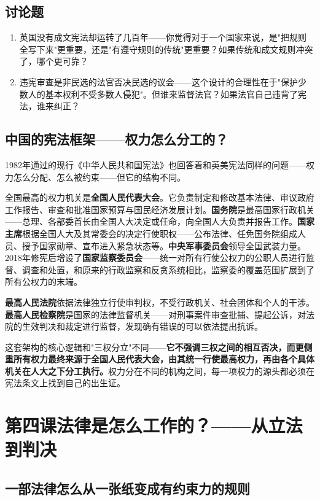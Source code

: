 \documentclass[a4paper,12pt]{ctexart}
\begin{document}
\subsection*{讨论题}
\begin{enumerate}
  \item 英国没有成文宪法却运转了几百年——你觉得对于一个国家来说，是"把规则全写下来"更重要，还是"有遵守规则的传统"更重要？如果传统和成文规则冲突了，哪个更可靠？
  \item 违宪审查是非民选的法官否决民选的议会——这个设计的合理性在于"保护少数人的基本权利不受多数人侵犯"。但谁来监督法官？如果法官自己违背了宪法，谁来纠正？
\end{enumerate}

\subsection*{中国的宪法框架——权力怎么分工的？}

1982年通过的现行《中华人民共和国宪法》也回答着和英美宪法同样的问题——权力怎么分配、怎么被约束——但它的结构不同。

全国最高的权力机关是\textbf{全国人民代表大会}。它负责制定和修改基本法律、审议政府工作报告、审查和批准国家预算与国民经济发展计划。\textbf{国务院}是最高国家行政机关——总理、各部委首长由全国人大决定或任命，向全国人大负责并报告工作。\textbf{国家主席}根据全国人大及其常委会的决定行使职权——公布法律、任免国务院组成人员、授予国家勋章、宣布进入紧急状态等。\textbf{中央军事委员会}领导全国武装力量。2018年修宪后增设了\textbf{国家监察委员会}——统一对所有行使公权力的公职人员进行监督、调查和处置，和原来的行政监察和反贪系统相比，监察委的覆盖范围扩展到了所有公权力的末端。

\textbf{最高人民法院}依据法律独立行使审判权，不受行政机关、社会团体和个人的干涉。\textbf{最高人民检察院}是国家的法律监督机关——对刑事案件审查批捕、提起公诉，对法院的生效判决和裁定进行监督，发现确有错误的可以依法提出抗诉。

这套架构的核心逻辑和"三权分立"不同——\textbf{它不强调三权之间的相互否决，而更侧重所有权力最终来源于全国人民代表大会，由其统一行使最高权力，再由各个具体机关在人大之下分工执行。}\:权力分在不同的机构之间，每一项权力的源头都必须在宪法条文上找到自己的出生证。

\newpage
\section{\textcolor{orange!80!black}{第四课\quad 法律是怎么工作的？——从立法到判决}}

\subsection*{一部法律怎么从一张纸变成有约束力的规则}
\end{document}
